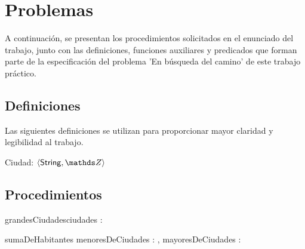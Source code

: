\documentclass[10pt,a4paper]{article}
\newcommand{\ciudad}{\ensuremath{\langle \mathsf{String} , \ent \rangle}}
\begin{document}
\maketitle

\section{Problemas}
A continuación, se presentan los procedimientos solicitados en el enunciado del trabajo, junto con las definiciones, funciones auxiliares y predicados que forman parte de la especificación del problema 'En búsqueda del camino' de este trabajo práctico.

\subsection{Definiciones}
Las siguientes definiciones se utilizan para proporcionar mayor claridad y legibilidad al trabajo.

Ciudad:   \ciudad


\subsection{Procedimientos}


\begin{proc}{grandesCiudades}{\In ciudades : }{ }
\end{proc}

\begin{proc}{sumaDeHabitantes}
{\In menoresDeCiudades : , \In mayoresDeCiudades : }{ }

\end{proc}
\end{document}
